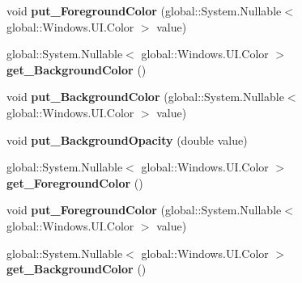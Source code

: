 \begin{DoxyCompactItemize}
\item 
\mbox{\label{interface_windows_1_1_u_i_1_1_view_management_1_1_i_status_bar_a03c9739bb308ccc616d87f58bc05687f}} 
void {\bfseries put\+\_\+\+Foreground\+Color} (global\+::\+System.\+Nullable$<$ global\+::\+Windows.\+U\+I.\+Color $>$ value)
\item 
\mbox{\label{interface_windows_1_1_u_i_1_1_view_management_1_1_i_status_bar_a9df6bc15ee0dfa95e094167c8cce06b0}} 
global\+::\+System.\+Nullable$<$ global\+::\+Windows.\+U\+I.\+Color $>$ {\bfseries get\+\_\+\+Background\+Color} ()
\item 
\mbox{\label{interface_windows_1_1_u_i_1_1_view_management_1_1_i_status_bar_a8bbd89095cf7637143e01eeacd3b8718}} 
void {\bfseries put\+\_\+\+Background\+Color} (global\+::\+System.\+Nullable$<$ global\+::\+Windows.\+U\+I.\+Color $>$ value)
\item 
\mbox{\label{interface_windows_1_1_u_i_1_1_view_management_1_1_i_status_bar_af58d730803477f79f79eadd2a909a319}} 
void {\bfseries put\+\_\+\+Background\+Opacity} (double value)
\item 
\mbox{\label{interface_windows_1_1_u_i_1_1_view_management_1_1_i_status_bar_af79d7da2c641f838f1b1ecf0141d571b}} 
global\+::\+System.\+Nullable$<$ global\+::\+Windows.\+U\+I.\+Color $>$ {\bfseries get\+\_\+\+Foreground\+Color} ()
\item 
\mbox{\label{interface_windows_1_1_u_i_1_1_view_management_1_1_i_status_bar_a03c9739bb308ccc616d87f58bc05687f}} 
void {\bfseries put\+\_\+\+Foreground\+Color} (global\+::\+System.\+Nullable$<$ global\+::\+Windows.\+U\+I.\+Color $>$ value)
\item 
\mbox{\label{interface_windows_1_1_u_i_1_1_view_management_1_1_i_status_bar_a9df6bc15ee0dfa95e094167c8cce06b0}} 
global\+::\+System.\+Nullable$<$ global\+::\+Windows.\+U\+I.\+Color $>$ {\bfseries get\+\_\+\+Background\+Color} ()

\end{DoxyCompactItemize}
